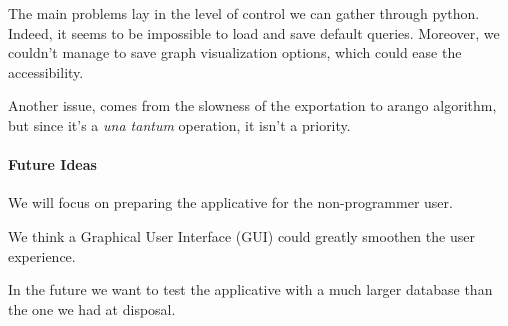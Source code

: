 \documentclass[11pt,twocolumn]{article}
\begin{document}
The main problems lay in the level of control we can gather through python. Indeed, it seems to be impossible to load and save default queries.
Moreover, we couldn't manage to save graph visualization options, which could ease the accessibility.

Another issue, comes from the slowness of the exportation to arango algorithm, but since it's a \textit{una tantum} operation, it isn't a priority.

\paragraph{Future Ideas}

We will focus on preparing the applicative for the non-programmer user.

We think a Graphical User Interface (GUI) could greatly smoothen the user experience.

In the future we want to test the applicative with a much larger database than the one we had at disposal.

\twocolumn[
\begin{@twocolumnfalse}


\end{@twocolumnfalse}
]
\end{document}
